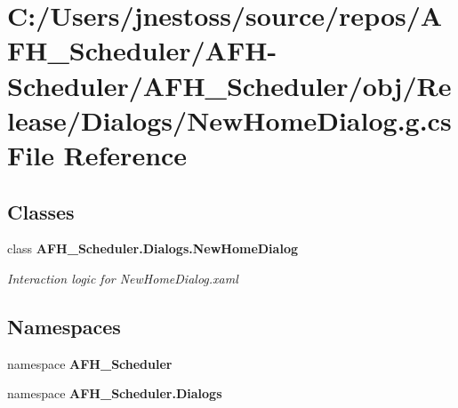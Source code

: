 \section{C\+:/\+Users/jnestoss/source/repos/\+A\+F\+H\+\_\+\+Scheduler/\+A\+F\+H-\/\+Scheduler/\+A\+F\+H\+\_\+\+Scheduler/obj/\+Release/\+Dialogs/\+New\+Home\+Dialog.g.\+cs File Reference}
\label{_release_2_dialogs_2_new_home_dialog_8g_8cs}
\subsection*{Classes}
\begin{DoxyCompactItemize}
\item 
class \textbf{ A\+F\+H\+\_\+\+Scheduler.\+Dialogs.\+New\+Home\+Dialog}
\begin{DoxyCompactList}\small\item\em Interaction logic for New\+Home\+Dialog.\+xaml \end{DoxyCompactList}\end{DoxyCompactItemize}
\subsection*{Namespaces}
\begin{DoxyCompactItemize}
\item 
namespace \textbf{ A\+F\+H\+\_\+\+Scheduler}
\item 
namespace \textbf{ A\+F\+H\+\_\+\+Scheduler.\+Dialogs}
\end{DoxyCompactItemize}
